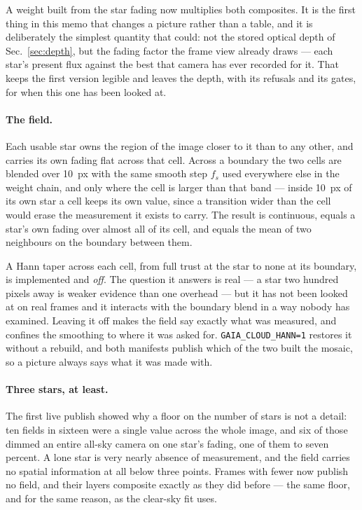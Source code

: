 \documentclass[11pt,a4paper]{article}
\begin{document}
A weight built from the star fading now multiplies both composites. It is the
first thing in this memo that changes a picture rather than a table, and it is
deliberately the simplest quantity that could: not the stored optical depth of
Sec.~\ref{sec:depth}, but the fading factor the frame view already draws ---
each star's present flux against the best that camera has ever recorded for it.
That keeps the first version legible and leaves the depth, with its refusals and
its gates, for when this one has been looked at.

\paragraph{The field.} Each usable star owns the region of the image closer to
it than to any other, and carries its own fading flat across that cell. Across a
boundary the two cells are blended over \SI{10}{px} with the same smooth step
$f_s$ used everywhere else in the weight chain, and only where the cell is
larger than that band --- inside \SI{10}{px} of its own star a cell keeps its
own value, since a transition wider than the cell would erase the measurement
it exists to carry. The result is continuous, equals a star's own fading over
almost all of its cell, and equals the mean of two neighbours on the boundary
between them.

A Hann taper across each cell, from full trust at the star to none at its
boundary, is implemented and \emph{off}. The question it answers is real --- a
star two hundred pixels away is weaker evidence than one overhead --- but it has
not been looked at on real frames and it interacts with the boundary blend in a
way nobody has examined. Leaving it off makes the field say exactly what was
measured, and confines the smoothing to where it was asked for.
\texttt{GAIA\_CLOUD\_HANN=1} restores it without a rebuild, and both manifests
publish which of the two built the mosaic, so a picture always says what it was
made with.

\paragraph{Three stars, at least.} The first live publish showed why a floor on
the number of stars is not a detail: ten fields in sixteen were a single value
across the whole image, and six of those dimmed an entire all-sky camera on one
star's fading, one of them to seven percent. A lone star is very nearly absence
of measurement, and the field carries no spatial information at all below three
points. Frames with fewer now publish no field, and their layers composite
exactly as they did before --- the same floor, and for the same reason, as the
clear-sky fit uses.
\end{document}
